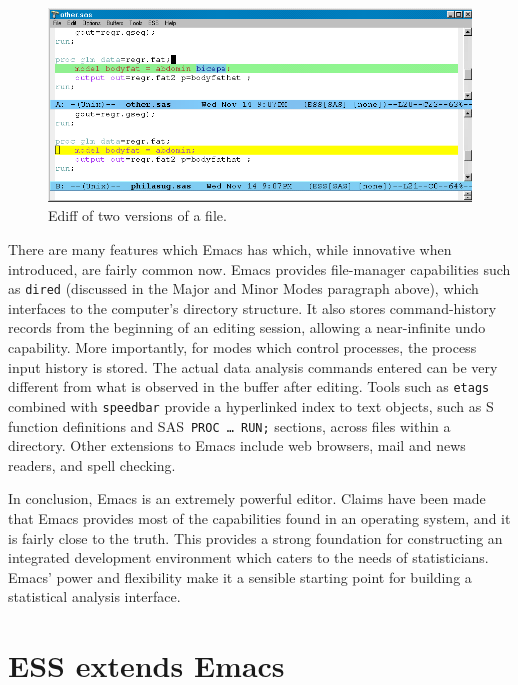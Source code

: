 \documentclass{article}
\newif\ifdraft
\newcommand*{\SAS}{\textsc{SAS}}
\newcommand{\stexttt}[1]{{\small\texttt{#1}}}
\newcommand{\emptyfig}{
\hspace*{42pt}\rule{324pt}{.25pt}\\
\hspace*{42pt}\rule{.25pt}{10pc}
\rule{316pt}{.25pt}
\rule{.25pt}{10pc}}
\begin{document}
\begin{figure}[htbp] 
  \centering
  \ifdraft
     \emptyfig
  \else
     \includegraphics[angle=270,width=\textwidth]{ediff-sas}
  \fi
  \caption{Ediff of two versions of a file.}
  \label{f.ediff}
\end{figure}

There are many features which Emacs has which, while innovative when
introduced, are fairly common now.  Emacs provides file-manager
capabilities such as \stexttt{dired} (discussed in the Major and Minor
Modes paragraph above), which interfaces to the computer's directory
structure.  It also stores command-history records from the beginning
of an editing session, allowing a near-infinite undo capability.  More
importantly, for modes which control processes, the process input
history is stored.  The actual data analysis commands entered can be
very different from what is observed in the buffer after editing.
Tools such as \stexttt{etags} combined with \stexttt{speedbar} provide
a hyperlinked index to text objects, such as S function definitions
and \SAS\ \stexttt{PROC \dots\ RUN;} sections, across files within a
directory.  Other extensions to Emacs include web browsers, mail and
news readers, and spell checking.

In conclusion, Emacs is an extremely powerful editor.  Claims have
been made that Emacs provides most of the capabilities found in an
operating system, and it is fairly close to the truth.  This provides
a strong foundation for constructing an integrated development
environment which caters to the needs of statisticians.  Emacs' power
and flexibility make it a sensible starting point for building a
statistical analysis interface.

\section{ESS extends Emacs}
\label{sec:ess-extends-emacs}
\end{document}
